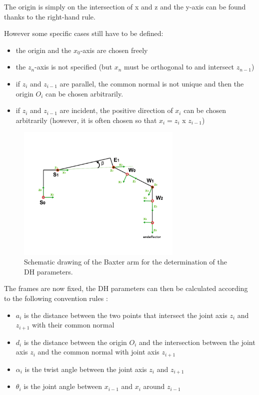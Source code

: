 \noindent The origin is simply on the intersection of x and z and the y-axis can be found thanks to the right-hand rule.\\
\newpage

However some specific cases still have to be defined: \\
\begin{itemize}
\item the origin and the $x_0$-axis are chosen freely
\item the $z_n$-axis is not specified (but $x_n$ must be orthogonal to and intersect $z_{n-1}$)
\item if $z_i$ and $z_{i-1}$ are parallel, the common normal is not unique and then the origin $O_i$ can be chosen arbitrarily.
\item if $z_i$ and $z_{i-1}$ are incident, the positive direction of $x_i$ can be chosen arbitrarily (however, it is often chosen so that $x_i = z_i$ x $z_{i-1}$)
\end{itemize}

 \begin{figure}[!ht]
	\centering
    \includegraphics[width = 0.7\textwidth]{Images/DHparam2}
    \caption{Schematic drawing of the Baxter arm for the determination of the DH parameters.}
    \label{fig:DHparam}
\end{figure}

\noindent The frames are now fixed, the DH parameters can then be calculated according to the following convention rules :\\
\begin{itemize}
\item $a_i$ is the distance between the two points that intersect the joint axis $z_i$ and $z_{i+1}$ with their common normal
\item $d_i$ is the distance between the origin $O_i$ and the intersection between the joint axis $z_i$ and the common normal with joint axis $z_{i+1}$
\item $\alpha_i$ is the twist angle between the joint axis $z_i$ and $z_{i+1}$
\item $\theta_i$ is the joint angle between $x_{i-1}$ and $x_i$ around $z_{i-1}$
\end{itemize}

